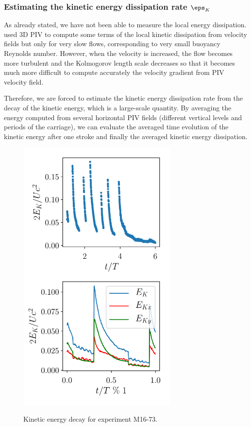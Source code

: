 \subsubsection{Estimating the kinetic energy dissipation rate $\eps_K$}

As already stated, we have not been able to measure the local energy
dissipation. \cite{PraudFinchamSommeria2005} used 3D PIV to compute some terms
of the local kinetic dissipation from velocity fields but only for very slow
flows, corresponding to very small buoyancy Reynolds number. However, when the
velocity is increased, the flow becomes more turbulent and the Kolmogorov
length scale decreases so that it becomes much more difficult to compute
accurately the velocity gradient from PIV velocity field.

Therefore, we are forced to estimate the kinetic energy dissipation rate from
the decay of the kinetic energy, which is a large-scale quantity. By averaging
the energy computed from several horizontal PIV fields (different vertical
levels and periods of the carriage), we can evaluate the averaged time
evolution of the kinetic energy after one stroke and finally the averaged
kinetic energy dissipation.

\begin{figure}
\includegraphics[width=80mm]{tmp/fig_energy_vs_time}
\label{fig:energy:vs:time}

\caption{Kinetic energy decay for experiment M16-73.}

\end{figure}

